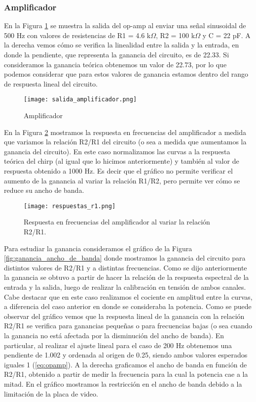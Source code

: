 \documentclass[a4paper, 11pt]{article}
\begin{document}
\subsubsection*{Amplificador}

En la Figura \ref{fig:salida_amplificador} se muestra la salida del op-amp al enviar una señal sinusoidal de 500 Hz con valores de resistencias de R1 = 4.6 k$\Omega$, R2 = 100 k$\Omega$ y C = 22 pF. A la derecha vemos cómo se verifica la linealidad entre la salida y la entrada, en donde la pendiente, que representa la ganancia del circuito, es de 22.33. Si consideramos la ganancia teórica obtenemos un valor de 22.73, por lo que podemos considerar que para estos valores de ganancia estamos dentro del rango de respuesta lineal del circuito.

\begin{figure} [H]
\centering
\texttt{[image: salida\_amplificador.png]}
\caption{ Amplificador\label{fig:salida_amplificador}}
\end{figure} 

 En la Figura \ref{fig:respuestas_r1} mostramos la respuesta en frecuencias del amplificador a medida que variamos la relación R2/R1 del circuito (o sea a medida que aumentamos la ganancia del circuito). En este caso normalizamos las curvas a la respuesta teórica del chirp (al igual que lo hicimos anteriormente) y también al valor de respuesta obtenido a 1000 Hz. Es decir que el gráfico no permite verificar el aumento de la ganancia al variar la relación R1/R2, pero permite ver cómo se reduce su ancho de banda. 

\begin{figure} [H]
\centering
\texttt{[image: respuestas\_r1.png]}
\caption{ Respuesta en frecuencias del amplificador al variar la relación R2/R1. \label{fig:respuestas_r1}}
\end{figure} 

Para estudiar la ganancia consideramos el gráfico de la Figura \ref{fig:ganancia_ancho_de_banda} donde mostramos la ganancia del circuito para distintos valores de R2/R1 y a distintas frecuencias. Como se dijo anteriormente la ganancia se obtuvo a partir de hacer la relación de la respuesta espectral de la entrada y la salida, luego de realizar la calibración en tensión de ambos canales. Cabe destacar que en este caso realizamos el cociente en amplitud entre la curvas, a diferencia del caso anterior en donde se consideraba la potencia. Como se puede observar del gráfico vemos que la respuesta lineal de la ganancia con la relación R2/R1 se verifica para ganancias pequeñas o para frecuencias bajas (o sea cuando la ganancia no está afectada por la disminución del ancho de banda). En particular, al realizar el ajuste lineal para el caso de 200 Hz obtenemos una pendiente de 1.002 y ordenada al origen de 0.25, siendo ambos valores esperados iguales 1 (\ref{eq:opamp}). A la derecha graficamos el ancho de banda en función de R2/R1, obtenido a partir de medir la frecuencia para la cual la potencia cae a la mitad. En el gráfico mostramos la restricción en el ancho de banda debido a la limitación de la placa de video.
\end{document}
